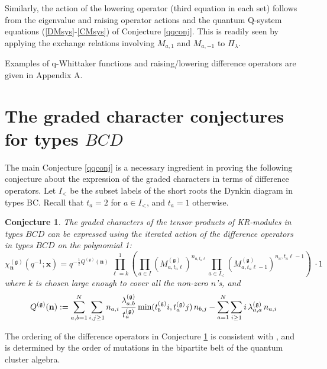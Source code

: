 \documentclass[12pt]{amsart}
\newtheorem{conj}[thm]{Conjecture}
\newcommand{\g}{{\mathfrak{g}}}
\newcommand{\bn}{{\mathbf n}}
\newcommand{\bx}{{\mathbf x}}
\numberwithin{equation}{section}
\numberwithin{table}{section}
\begin{document}
Similarly, the action of the lowering operator (third equation in each set) follows from the eigenvalue and raising operator actions and the quantum Q-system equations (\ref{DMsys}-\ref{CMsys})
of Conjecture \ref{qqconj}.
This is readily seen by applying the exchange relations involving $M_{a,1}$ and $M_{a,-1}$ 
to $\Pi_\lambda$.  

Examples of q-Whittaker functions and raising/lowering difference operators are given in Appendix A.

\section{The graded character conjectures for types $BCD$}

The main Conjecture \ref{qqconj} is a necessary ingredient in proving the following
conjecture about the expression of the graded characters in terms of difference operators. Let $I_<$ be the subset labels of the short roots the Dynkin diagram in types BC. Recall that $t_a=2$ for $a\in I_<$, and $t_a=1$ otherwise.

\begin{conj}\label{gradconj} 
The graded characters of the tensor products of KR-modules in types $BCD$ can be expressed using the iterated action of the difference operators in types $BCD$ on the polynomial 1:
$$
\chi_{\bn}^{(\g)}(q^{-1};\bx)=q^{-\frac{1}{2}Q^{(\g)}(\bn)}\, \prod_{\ell=k}^1\left(  \prod_{a\in I} (M_{ a,t_a\ell}^{(\g)})^{n_{a,t_a\ell}} \prod_{a\in I_<} (M_{a, t_a\ell-1}^{(\g)})^{n_a,t_a\ell-1}\right)\ \cdot 1
$$
where $k$ is chosen large enough to cover all the non-zero $n$'s, and
$$Q^{(\g)}(\bn):=\sum_{a,b=1}^N\sum_{i,j\geq 1} n_{a,i}\,\frac{\lambda_{a,b}^{(\g)} }{t_a^{(\g)}}\,
{\rm min}(t_b^{(\g)} i,t_a^{(\g)} j) \, n_{b,j} -\sum_{a=1}^N \sum_{i\geq 1} i\,  \lambda_{a,a}^{(\g)}\, n_{a,i}
$$
\end{conj}

The ordering of the difference operators in Conjecture \ref{gradconj} is consistent with \cite{qKR,Simon}, and is determined by the order of mutations in the bipartite belt of the quantum cluster algebra.
\end{document}
